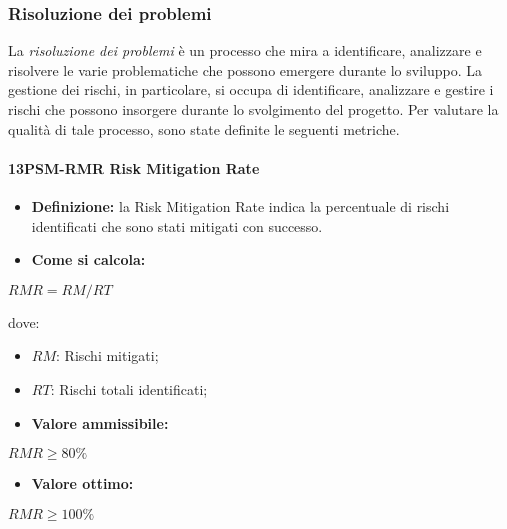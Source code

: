 \subsubsection{Risoluzione dei problemi}
La \emph{risoluzione dei problemi} è un processo che mira a identificare, analizzare e risolvere le
varie problematiche che possono emergere durante lo sviluppo. La gestione dei rischi,
in particolare, si occupa di identificare, analizzare e gestire i rischi che possono insorgere
durante lo svolgimento del progetto. Per valutare la qualità di tale processo, sono state
definite le seguenti metriche.

\paragraph*{13PSM-RMR Risk Mitigation Rate}
\begin{itemize}
    \item \textbf{Definizione:} la Risk Mitigation Rate indica la percentuale di rischi identificati che sono stati mitigati con successo.
    \item \textbf{Come si calcola:}
\end{itemize}
\begin{center}
    $RMR = RM/RT$ 
 \end{center}
 dove:
 \begin{itemize}[label=$\rightarrow$]
     \item $RM$: Rischi mitigati;
     \item $RT$: Rischi totali identificati;
 \end{itemize}
\begin{itemize}
    \item \textbf{Valore ammissibile:}
\end{itemize}
\begin{center}
    $RMR \geq 80\%$
\end{center}
\begin{itemize}
    \item \textbf{Valore ottimo:}
\end{itemize}
\begin{center}
    $RMR \geq 100\%$
\end{center}

